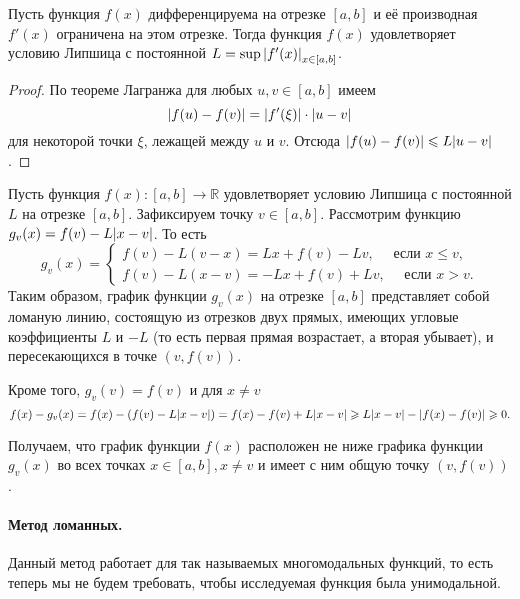 \begin{theorem}
	Пусть функция $f(x)$ дифференцируема на отрезке $[a, b]$ и её производная $f'(x)$ ограничена на этом отрезке. Тогда функция $f(x)$ удовлетворяет условию Липшица с постоянной $L = \sup{\abs{f'(x)}}_{x \in [a, b]}$.
\end{theorem}
\begin{proof}
	По теореме Лагранжа для любых $u, v \in [a, b]$ имеем 
	\begin{equation*}
		\abs{f(u) - f(v)} = \abs{f'(\xi)} \cdot \abs{u -v}
	\end{equation*}
	для некоторой точки $\xi$, лежащей между $u$ и $v$. Отсюда $\abs{f(u) - f(v)} \leqslant L\abs{u - v}$. 
\end{proof}

\begin{utv}
	Пусть функция $f(x) : [a, b] \to \mathbb{R}$ удовлетворяет условию Липшица с постоянной $L$ на отрезке $[a, b]$. Зафиксируем точку $v \in [a, b]$. Рассмотрим функцию $g_{v}(x) = f(v) - L\abs{x - v}$. То есть
	\begin{equation*}
		g_v(x) = \begin{cases}
			f(v) - L(v - x) = L x + f(v) - L v, \quad \text{ если } x \leqslant v, \\
			f(v) - L(x - v) = - L x + f(v) + L v, \quad \text{ если } x > v.
		\end{cases}
	\end{equation*}
	Таким образом, график функции $g_v(x)$ на отрезке $[a, b]$ представляет собой ломаную линию, состоящую из отрезков двух прямых, имеющих угловые коэффициенты $L$ и $-L$ (то есть первая прямая возрастает, а вторая убывает), и пересекающихся в точке $(v, f(v))$. 
	
	Кроме того, $g_v(v) = f(v)$ и для $x \not = v$
	\begin{equation*}
		f(x) - g_v(x) = f(x) - (f(v) - L\abs{x - v}) = f(x) - f(v) + L\abs{x - v} \geqslant L \abs{x - v} - \abs{f(x) - f(v)} \geqslant 0. 
	\end{equation*}
	
	Получаем, что график функции $f(x)$ расположен не ниже графика функции $g_v(x)$ во всех точках $x \in [a, b], x \not = v$ и имеет с ним общую точку $(v, f(v))$.
\end{utv}

\paragraph{Метод ломанных. } Данный метод работает для так называемых многомодальных функций, то есть теперь мы не будем требовать, чтобы исследуемая функция была унимодальной. 

